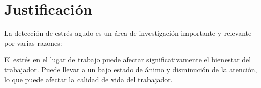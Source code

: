 



\section{Justificación} 


La detección de estrés agudo es un área de investigación importante y relevante por varias razones:

El estrés en el lugar de trabajo puede afectar significativamente el bienestar del trabajador. Puede llevar a un bajo estado de ánimo y disminución de la atención, lo que puede afectar la calidad de vida del trabajador.

